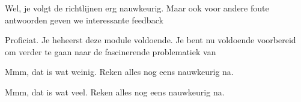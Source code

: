 \documentclass{ximera}
\begin{document}
\begin{problem}
\begin{question}
 
      
          \begin{feedback}[y==7]
            Wel, je volgt de richtlijnen erg nauwkeurig. Maar ook voor andere foute antwoorden geven we interessante feedback
          \end{feedback}
          \begin{feedback}[y==8]
          Proficiat. Je heheerst deze module voldoende. Je bent nu voldoende voorbereid om verder te gaan naar de fascinerende problematiek van 
          \end{feedback}
          \begin{feedback}[y<7]
              Mmm, dat is wat weinig. Reken alles nog eens nauwkeurig na.
            \end{feedback}
          \begin{feedback}[y>8]
               Mmm, dat is wat veel. Reken alles nog eens nauwkeurig na.
           \end{feedback}
       \end{question}
\end{problem}

\begin{comment}
\subsubsection{Ken je Sage al?}

In Sage kan je relatief eenvoudig de parametervergelijkingen van een cirkel bestuderen:

\begin{sageCell}
    var('s t')
    x(t) = 3*cos(t)
    y(t) = 3*sin(t)
    c(t) = (x(t),y(t))
    circle=parametric_plot(c(t),(t,0,2*pi),color="black")
    circle
\end{sageCell}

\pdfOnly{In de onlineversie kan je met deze code experimenteren. 
    
    Zie [één of andere ingewikkelde url] of [een qrcode]
}

\begin{onlineOnly}
    
    Pas de code aan, en druk op Evaluate!
    
    Nice, zoals ze zeggen ...
    
\begin{sageOutput}
    var('s t')
    x(t) = 3*cos(t)
    y(t) = 3*sin(t)
    c(t) = (x(t),y(t))
    circle=parametric_plot(c(t),(t,0,2*pi),color="black")
    circle
\end{sageOutput}
\end{onlineOnly}
\end{comment}
\end{document}
